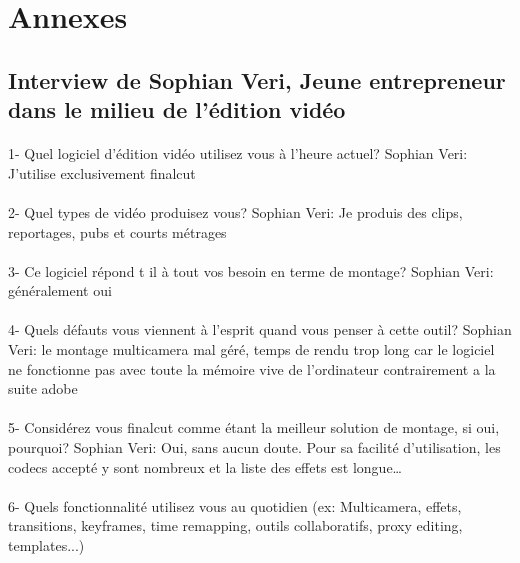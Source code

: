 \newpage
\section {Annexes}
\subsection {Interview de Sophian Veri,
Jeune entrepreneur dans le milieu de l'édition vidéo}

\paragraph{}
1-  Quel logiciel d'édition vidéo utilisez vous à l'heure actuel?
Sophian Veri: J'utilise exclusivement finalcut

\paragraph{}
2- Quel types de vidéo produisez vous?
Sophian Veri: Je produis des clips, reportages, pubs et courts métrages

\paragraph{}
3- Ce logiciel répond t il à tout vos besoin en terme de montage?
Sophian Veri: généralement oui

\paragraph{}
4- Quels défauts vous viennent à l'esprit quand vous penser à cette outil?
Sophian Veri: le montage multicamera mal géré, temps de rendu trop long car le
logiciel ne fonctionne pas avec toute la mémoire vive de l'ordinateur
contrairement a la suite adobe

\paragraph{}
5- Considérez vous finalcut comme étant la meilleur solution de montage,
si oui, pourquoi?
Sophian Veri: Oui, sans aucun doute. Pour sa facilité d'utilisation,
les codecs accepté y sont nombreux et la liste des effets est
longue\ldots

\paragraph{}
6-  Quels fonctionnalité utilisez vous au quotidien (ex: Multicamera, effets,
transitions, keyframes, time remapping, outils collaboratifs, proxy
editing, templates...)

